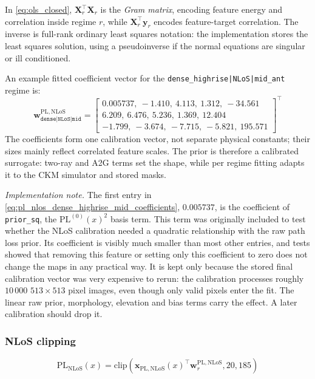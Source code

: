 In \eqref{eq:ols_closed}, \(\textbf{X}_r^\top\textbf{X}_r\) is the
\emph{Gram matrix}, encoding feature energy and correlation inside regime
\(r\), while \(\textbf{X}_r^\top\textbf{y}_r\) encodes feature-target
correlation. The inverse is full-rank ordinary least squares notation: the
implementation stores the least squares solution, using a pseudoinverse if the
normal equations are singular or ill conditioned.

An example fitted coefficient vector for the \texttt{dense\_highrise|NLoS|mid\_ant}
regime is:
\begin{equation}
\textbf{w}^{\mathrm{PL,NLoS}}_{\texttt{dense|NLoS|mid}}
=
\begin{bmatrix}
0.005737,\ -1.410,\ 4.113,\ 1.312,\ -34.561 \\[3pt]
6.209,\ 6.476,\ 5.236,\ 1.369,\ 12.404 \\[3pt]
-1.799,\ -3.674,\ -7.715,\ -5.821,\ 195.571
\end{bmatrix}^\top
\label{eq:pl_nlos_dense_highrise_mid_coefficients}
\end{equation}
The coefficients form one calibration vector, not separate physical constants;
their sizes mainly reflect correlated feature scales. The prior is therefore a
calibrated surrogate: two-ray and A2G terms set the shape, while per regime
fitting adapts it to the CKM simulator and stored masks.

\emph{Implementation note.} The first entry in
\eqref{eq:pl_nlos_dense_highrise_mid_coefficients}, \(0.005737\), is the
coefficient of \texttt{prior\_sq}, the \(\mathrm{PL}^{(0)}(x)^2\) basis term.
This term was originally included to test whether the NLoS calibration needed a
quadratic relationship with the raw path loss prior. Its coefficient is visibly
much smaller than most other entries, and tests showed that removing this
feature or setting only this coefficient to zero does not change the maps in
any practical way. It is kept only because the stored final calibration vector
was very expensive to rerun: the calibration processes roughly \(10\,000\)
\(513\times513\) pixel images, even though only valid pixels enter the fit. The
linear raw prior, morphology, elevation and bias terms carry the effect. A
later calibration should drop it.

\subsubsection{NLoS clipping}

\begin{equation}
\mathrm{PL}_{\mathrm{NLoS}}(x)
=
\mathrm{clip}\!\left(
\textbf{x}_{\mathrm{PL,NLoS}}(x)^\top
\textbf{w}^{\mathrm{PL,NLoS}}_{r},
20,
185
\right)
\label{eq:pl_nlos_final}
\end{equation}

